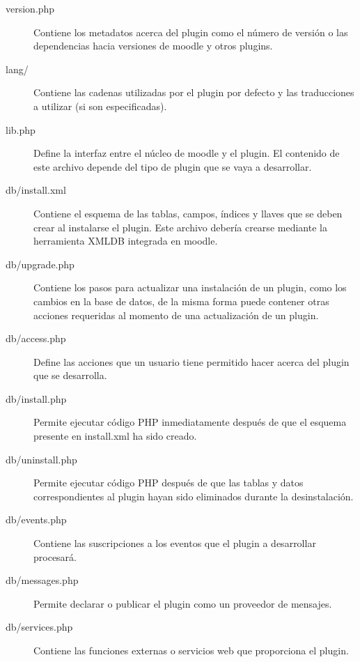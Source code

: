 \begin{description}
    \item[version.php]
    Contiene los metadatos acerca del plugin como el número de versión o las
    dependencias hacia versiones de moodle y otros plugins.

    \item[lang/] Contiene las cadenas utilizadas por el plugin por defecto y
    las traducciones a utilizar (si son especificadas).

    \item[lib.php] Define la interfaz entre el núcleo de moodle y el plugin.
    El contenido de este archivo depende del tipo de plugin que se vaya a
    desarrollar.

    \item[db/install.xml] Contiene el esquema de las tablas, campos, índices
    y llaves que se deben crear al instalarse el plugin. Este archivo debería
    crearse mediante la herramienta XMLDB integrada en moodle.

    \item[db/upgrade.php] Contiene los pasos para actualizar una instalación de
    un plugin, como los cambios en la base de datos, de la misma forma puede
    contener otras acciones requeridas al momento de una actualización de un
    plugin.

    \item[db/access.php]
    Define las acciones que un usuario tiene permitido
    hacer acerca del plugin que se desarrolla.

    \item[db/install.php]
    Permite ejecutar código PHP inmediatamente después
    de que el esquema presente en install.xml ha sido creado.

    \item[db/uninstall.php]
    Permite ejecutar código PHP después de que las tablas
    y datos correspondientes al plugin hayan sido eliminados durante la
    desinstalación.

    \item[db/events.php]
    Contiene las suscripciones a los eventos que el plugin a desarrollar procesará.

    \item[db/messages.php]
    Permite declarar o publicar el plugin como un proveedor de mensajes.

    \item[db/services.php]
    Contiene las funciones externas o servicios web que proporciona el plugin.


\end{description}
